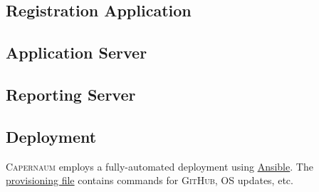 \documentclass{article}
\newcommand{\ghsrc}[2]{\href{https://github.com/quantum-bits/capernaum/blob/development/#1}{#2}}
\newcommand{\caper}{\textsc{Capernaum}}
\newcommand{\gh}{\textsc{GitHub}}
\begin{document}
\subsection{Registration Application}
\label{sec:group-application}

\subsection{Application Server}
\label{sec:application-server}

\subsection{Reporting Server}
\label{sec:reporting-server}

\subsection{Deployment}
\label{sec:deployment}

\caper{} employs a fully-automated deployment
using \href{https://www.ansible.com/}{Ansible}.
The \ghsrc{ansible/provision.yaml}{provisioning file} contains commands for \gh{}, OS updates, etc.
\end{document}
